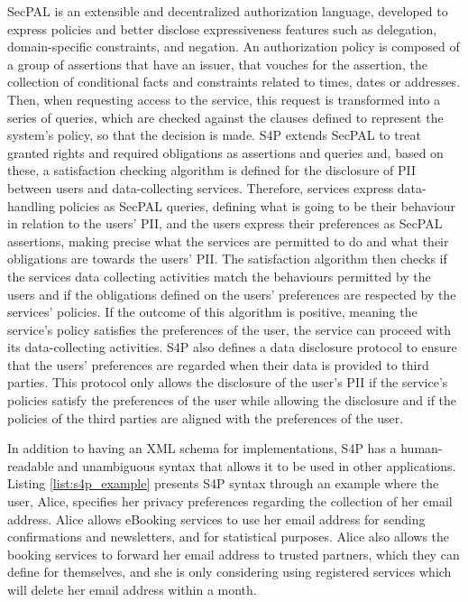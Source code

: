 SecPAL \citep{becker_design_2007} is an extensible and decentralized authorization language, developed to express policies and better disclose expressiveness features such as delegation, domain-specific constraints, and negation.
An authorization policy is composed of a group of assertions that have an issuer, that vouches for the assertion, the collection of conditional facts and constraints related to times, dates or addresses.
Then, when requesting access to the service, this request is transformed into a series of queries, which are checked against the clauses defined to represent the system's policy, so that the decision is made.
S4P extends SecPAL to treat granted rights and required obligations as assertions and queries and, based on these, a satisfaction checking algorithm is defined for the disclosure of PII between users and data-collecting services.
Therefore, services express data-handling policies as SecPAL queries, defining what is going to be their behaviour in relation to the users' PII, and the users express their preferences as SecPAL assertions, making precise what the services are permitted to do and what their obligations are towards the users' PII.
The satisfaction algorithm then checks if the services data collecting activities match the behaviours permitted by the users and if the obligations defined on the users' preferences are respected by the services' policies.
If the outcome of this algorithm is positive, meaning the service's policy satisfies the preferences of the user, the service can proceed with its data-collecting activities.
S4P also defines a data disclosure protocol to ensure that the users' preferences are regarded when their data is provided to third parties.
This protocol only allows the disclosure of the user's PII if the service's policies satisfy the preferences of the user while allowing the disclosure and if the policies of the third parties are aligned with the preferences of the user.

In addition to having an XML schema for implementations, S4P has a human-readable and unambiguous syntax that allows it to be used in other applications.
Listing \ref{list:s4p_example} presents S4P syntax through an example where the user, Alice, specifies her privacy preferences regarding the collection of her email address. Alice allows eBooking services to use her email address for sending confirmations and newsletters, and for statistical purposes. Alice also allows the booking services to forward her email address to trusted partners, which they can define for themselves, and she is only considering using registered services which will delete her email address within a month.


